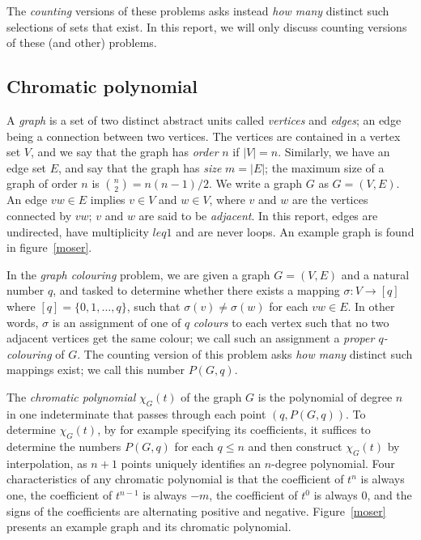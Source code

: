 \documentclass{cslthse-msc}
\begin{document}
The \emph{counting} versions of these problems asks instead \emph{how many} distinct such selections of sets that exist. In this report, we will only discuss counting versions of these (and other) problems.

\subsection{Chromatic polynomial}
A \emph{graph} is a set of two distinct abstract units called \emph{vertices} and \emph{edges}; an edge being a connection between two vertices. The vertices are contained in a vertex set $V$, and we say that the graph has \emph{order} $n$ if $|V| = n$. Similarly, we have an edge set $E$, and say that the graph has \emph{size} $m = |E|$; the maximum size of a graph of order $n$ is $\binom{n}{2} = n(n-1)/2$. We write a graph $G$ as $G = (V,E)$. An edge $vw \in E$ implies $v \in V$ and $w \in V$, where $v$ and $w$ are the vertices connected by $vw$; $v$ and $w$ are said to be \emph{adjacent}. In this report, edges are undirected, have multiplicity $leq 1$ and are never loops. An example graph is found in figure~\ref{moser}.

In the \emph{graph colouring} problem, we are given a graph $G = (V,E)$ and a natural number $q$, and tasked to determine whether there exists a mapping $\sigma: V \rightarrow [q]$ where $[q] = \{0,1,\ldots,q\}$, such that $\sigma(v) \neq \sigma(w)$ for each $vw \in E$. In other words, $\sigma$ is an assignment of one of $q$ \emph{colours} to each vertex such that no two adjacent vertices get the same colour; we call such an assignment a \emph{proper $q$-colouring} of $G$. The counting version of this problem asks \emph{how many} distinct such mappings exist; we call this number $P(G,q)$.

The \emph{chromatic polynomial} $\chi_G(t)$ of the graph $G$ is the polynomial of degree $n$ in one indeterminate that passes through each point $(q, P(G,q))$. To determine $\chi_G(t)$, by for example specifying its coefficients, it suffices to determine the numbers $P(G,q)$ for each $q \leq n$ and then construct $\chi_G(t)$ by interpolation, as $n + 1$ points uniquely identifies an $n$-degree polynomial. Four characteristics of any chromatic polynomial is that the coefficient of $t^n$ is always one, the coefficient of $t^{n-1}$ is always $-m$, the coefficient of $t^0$ is always 0, and the signs of the coefficients are alternating positive and negative. Figure~\ref{moser} presents an example graph and its chromatic polynomial.
\end{document}
